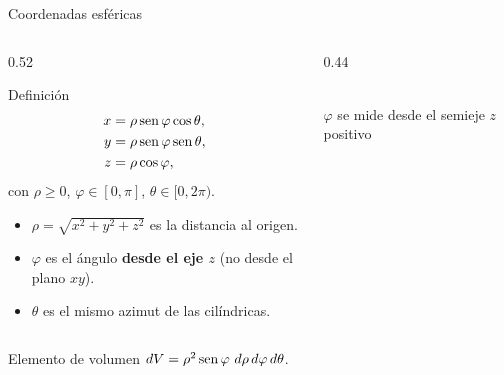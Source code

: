 \documentclass[11pt,aspectratio=169]{beamer}
\begin{document}
\begin{frame}{Coordenadas esféricas}
  \begin{columns}
    \begin{column}{0.52\textwidth}
      \begin{block}{Definición}
        \[
          \begin{aligned}
            x&=\rho\operatorname{sen}\varphi\cos\theta,\\
            y&=\rho\operatorname{sen}\varphi\operatorname{sen}\theta,\\
            z&=\rho\cos\varphi,
          \end{aligned}
        \]
        con $\rho\ge0$, $\varphi\in[0,\pi]$, $\theta\in[0,2\pi)$.
      \end{block}
      \pause
      \begin{itemize}\small
        \item $\rho=\sqrt{x^2+y^2+z^2}$ es la distancia al origen.
        \item $\varphi$ es el ángulo \textbf{desde el eje $z$} (no desde el plano $xy$).
        \item $\theta$ es el mismo azimut de las cilíndricas.
      \end{itemize}
    \end{column}
    \begin{column}{0.44\textwidth}
      \centering
      \\[2pt]
      {\footnotesize\color{gray60} $\varphi$ se mide desde el semieje $z$ positivo}
    \end{column}
  \end{columns}
  \pause
  \begin{block}{Elemento de volumen}
    \centering $dV=\rho^2\sen\varphi\ d\rho\,d\varphi\,d\theta$.
  \end{block}
\end{frame}
\end{document}
